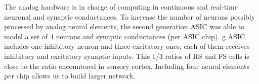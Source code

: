 The analog hardware is in charge of computing in continuous and
real-time neuronal and synaptic conductances. To increase the number
of neurons possibly processed by analog neural elements, the second
generation ASIC was able to model a set of 4 neurons and synaptic
conductances (per ASIC chip). {\2g} ASIC includes one inhibitory
neuron and three excitatory ones; each of them receives inhibitory
and excitatory synaptic inputs. This 1/3 ratios of RS and FS cells is
close to the ratio encountered in sensory cortex. Including four
neural elements per chip allows us to build larger network. \\



